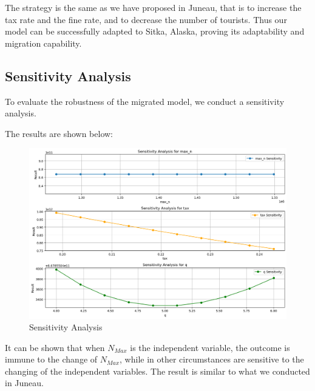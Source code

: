 The strategy is the same as we have proposed in Juneau, 
that is to increase the tax rate and the fine rate, and to 
decrease the number of tourists. Thus our model can be successfully
adapted to Sitka, Alaska, proving its adaptability and migration capability.

\subsection{Sensitivity Analysis}

To evaluate the robustness of the migrated model, we conduct a sensitivity analysis.

The results are shown below:

\begin{figure}[H]
    \centering
    \includegraphics[width=1\textwidth]{Sensitivity_Analysis_Sitka.jpg} %
    \vspace{-0.5cm}
    \caption{Sensitivity Analysis}
\end{figure}

It can be shown that when $N_{Max}$ is the independent variable, the outcome is immune to the change of $N_{Max}$,
while in other circumstances are sensitive to the changing of the independent variables.
The result is similar to what we conducted in Juneau.